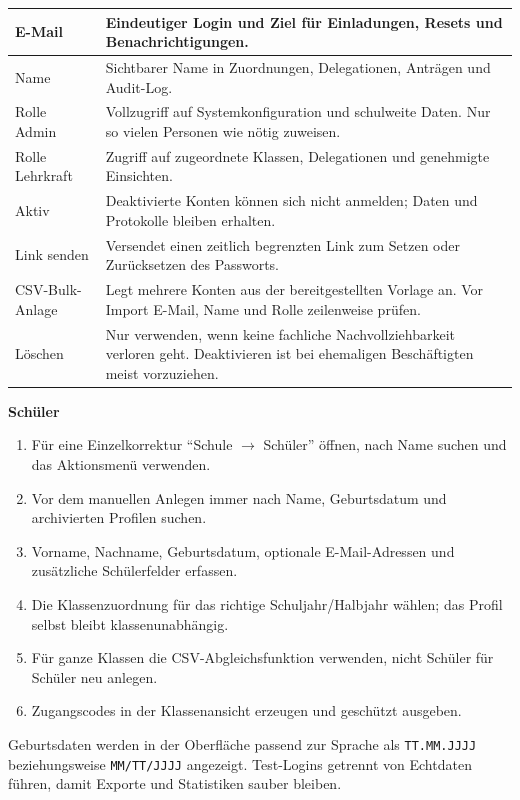 \documentclass[12pt,a4paper]{article}
\begin{document}
\begin{tabularx}{\textwidth}{|p{}|X|}
\hline
E-Mail & Eindeutiger Login und Ziel für Einladungen, Resets und Benachrichtigungen.\\
\hline
Name & Sichtbarer Name in Zuordnungen, Delegationen, Anträgen und Audit-Log.\\
\hline
Rolle Admin & Vollzugriff auf Systemkonfiguration und schulweite Daten. Nur so vielen Personen wie nötig zuweisen.\\
\hline
Rolle Lehrkraft & Zugriff auf zugeordnete Klassen, Delegationen und genehmigte Einsichten.\\
\hline
Aktiv & Deaktivierte Konten können sich nicht anmelden; Daten und Protokolle bleiben erhalten.\\
\hline
Link senden & Versendet einen zeitlich begrenzten Link zum Setzen oder Zurücksetzen des Passworts.\\
\hline
CSV-Bulk-Anlage & Legt mehrere Konten aus der bereitgestellten Vorlage an. Vor Import E-Mail, Name und Rolle zeilenweise prüfen.\\
\hline
Löschen & Nur verwenden, wenn keine fachliche Nachvollziehbarkeit verloren geht. Deaktivieren ist bei ehemaligen Beschäftigten meist vorzuziehen.\\
\hline
\end{tabularx}

\textbf{Schüler}
\begin{enumerate}
  \item Für eine Einzelkorrektur \enquote{Schule \(\rightarrow\) Schüler} öffnen, nach Name suchen und das Aktionsmenü verwenden.
  \item Vor dem manuellen Anlegen immer nach Name, Geburtsdatum und archivierten Profilen suchen.
  \item Vorname, Nachname, Geburtsdatum, optionale E-Mail-Adressen und zusätzliche Schülerfelder erfassen.
  \item Die Klassenzuordnung für das richtige Schuljahr/Halbjahr wählen; das Profil selbst bleibt klassenunabhängig.
  \item Für ganze Klassen die CSV-Abgleichsfunktion verwenden, nicht Schüler für Schüler neu anlegen.
  \item Zugangscodes in der Klassenansicht erzeugen und geschützt ausgeben.
\end{enumerate}

Geburtsdaten werden in der Oberfläche passend zur Sprache als \texttt{TT.MM.JJJJ} beziehungsweise \texttt{MM/TT/JJJJ} angezeigt. Test-Logins getrennt von Echtdaten führen, damit Exporte und Statistiken sauber bleiben.
\end{document}
